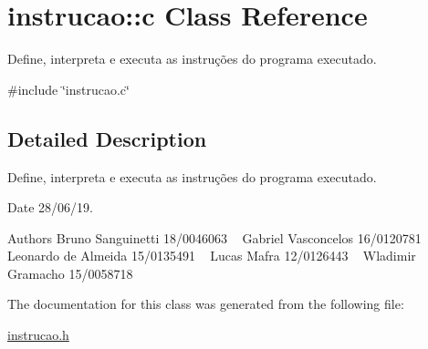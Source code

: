 \hypertarget{classinstrucao_1_1c}{}\section{instrucao\+:\+:c Class Reference}
\label{classinstrucao_1_1c}


Define, interpreta e executa as instruções do programa executado.  




{\ttfamily \#include \char`\"{}instrucao.\+c\char`\"{}}



\subsection{Detailed Description}
Define, interpreta e executa as instruções do programa executado. 

\begin{DoxyDate}{Date}
28/06/19.
\end{DoxyDate}
\begin{DoxyAuthor}{Authors}
Bruno Sanguinetti 18/0046063 ~\newline
Gabriel Vasconcelos 16/0120781 ~\newline
Leonardo de Almeida 15/0135491 ~\newline
Lucas Mafra 12/0126443 ~\newline
Wladimir Gramacho 15/0058718 ~\newline

\end{DoxyAuthor}


The documentation for this class was generated from the following file\+:\begin{DoxyCompactItemize}
\item 
\hyperlink{instrucao_8h}{instrucao.\+h}\end{DoxyCompactItemize}
